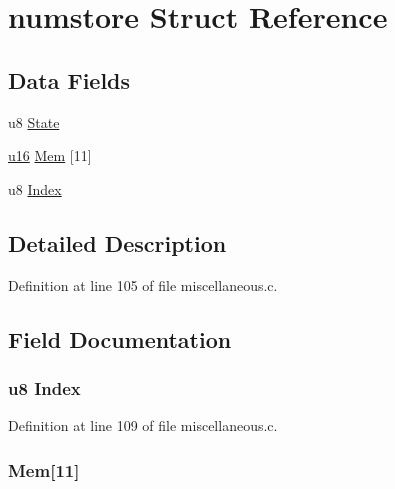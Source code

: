 \hypertarget{structnumstore}{\section{numstore \-Struct \-Reference}
\label{structnumstore}
}
\subsection*{\-Data \-Fields}
\begin{DoxyCompactItemize}
\item 
u8 \hyperlink{structnumstore_a35c66c877f571457e71e669b0c64d5b0}{\-State}
\item 
\hyperlink{main__ED__BM_8c_a9e6c91d77e24643b888dbd1a1a590054}{u16} \hyperlink{structnumstore_aa898d2d6fea9eecd50e2808b9e93dd3b}{\-Mem} \mbox{[}11\mbox{]}
\item 
u8 \hyperlink{structnumstore_aae16e0ab605e82ea6ccd9891a910f86a}{\-Index}
\end{DoxyCompactItemize}


\subsection{\-Detailed \-Description}


\-Definition at line 105 of file miscellaneous.\-c.



\subsection{\-Field \-Documentation}
\hypertarget{structnumstore_aae16e0ab605e82ea6ccd9891a910f86a}{
\subsubsection[{\-Index}]{\setlength{\rightskip}{0pt plus 5cm}u8 {\bf \-Index}}}\label{structnumstore_aae16e0ab605e82ea6ccd9891a910f86a}


\-Definition at line 109 of file miscellaneous.\-c.

\hypertarget{structnumstore_aa898d2d6fea9eecd50e2808b9e93dd3b}{
\subsubsection[{\-Mem}]{ {\bf \-Mem}\mbox{[}11\mbox{]}}}\label{structnumstore_aa898d2d6fea9eecd50e2808b9e93dd3b}


